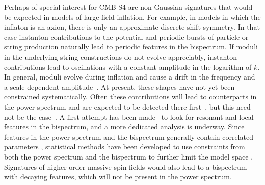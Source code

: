 Perhaps of special interest for CMB-S4 are non-Gaussian signatures that would be expected in models of large-field inflation. For example, in models in which the inflaton is an axion, there is only an approximate discrete shift symmetry. In that case instanton contributions to the potential and periodic bursts of particle or string production naturally lead to periodic features in the bispectrum. If moduli in the underlying string constructions do not evolve appreciably, instanton contributions lead to oscillations with a constant amplitude in the logarithm of $k$. In general, moduli evolve during inflation and cause a drift in the frequency and a scale-dependent amplitude~\cite{Flauger:2014ana}. At present, these shapes have not yet been constrained systematically. Often these contributions will lead to counterparts in the power spectrum and are expected to be detected there first~\cite{Behbahani:2011it}, but this need not be the case~\cite{Behbahani:2012be}. A first attempt has been made~\cite{Ade:2015ava} to look for resonant and local features in the bispectrum, and a more dedicated analysis is underway. Since features in the power spectrum and the bispectrum generally contain correlated parameters \cite{Meerburg:2009ys,Achucarro:2010da, Flauger:2010ja,Meerburg:2015yka,Achucarro:2012fd,Palma:2014hra}, statistical methods have been developed to use constraints from both the power spectrum and the bispectrum to further limit the model space \cite{Fergusson:2014hya,Fergusson:2014tza,Meerburg:2015owa}. Signatures of higher-order massive spin fields \cite{Arkani-Hamed:2015bza,Chen:2015lza} would also lead to a bispectrum with decaying features, which will not be present in the power spectrum.


%



